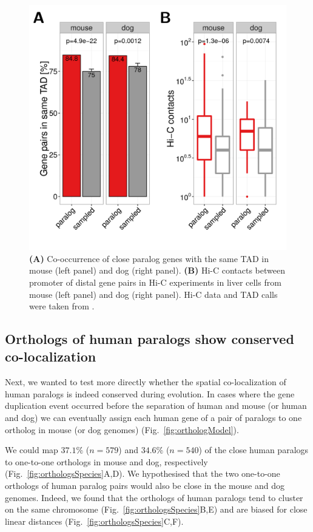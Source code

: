 \documentclass[a4paper,twoside=true,openright,parskip=full,chapterprefix=true,11pt,headings=normal,bibliography=totoc,listof=totoc,titlepage=on,captions=tableabove,draft=false]{scrreprt}
\theoremstyle{definition}
\theoremstyle{definition}
\theoremstyle{definition}
\theoremstyle{remark}
\begin{document}
\begin{figure}

{\centering \includegraphics[width=0.5\linewidth]{figures/paralog/fig5_09} 

}

\caption{\textbf{(A)} Co-occurrence of close paralog genes
with the same TAD in mouse (left panel) and dog (right panel).
\textbf{(B)} Hi-C contacts between promoter of distal gene pairs in Hi-C
experiments in liver cells from mouse (left panel) and dog (right
panel). Hi-C data and TAD calls were taken from \citep{VietriRudan2015}.}\label{fig:paralogsMouseDog}
\end{figure}







\hypertarget{orthologs-of-human-paralogs-show-conserved-co-localization}{%
\subsection{Orthologs of human paralogs show conserved
co-localization}\label{orthologs-of-human-paralogs-show-conserved-co-localization}}

Next, we wanted to test more directly whether the spatial
co-localization of human paralogs is indeed conserved during evolution.
In cases where the gene duplication event occurred before the separation
of human and mouse (or human and dog) we can eventually assign each
human gene of a pair of paralogs to one ortholog in mouse (or dog
genomes) (Fig.~\ref{fig:orthologModel}).

We could map \(37.1\%\) (\(n=579\)) and \(34.6\%\) (\(n=540\)) of the
close human paralogs to one-to-one orthologs in mouse and dog,
respectively (Fig.~\ref{fig:orthologsSpecies}A,D). We hypothesised that
the two one-to-one orthologs of human paralog pairs would also be close
in the mouse and dog genomes. Indeed, we found that the orthologs of
human paralogs tend to cluster on the same chromosome
(Fig.~\ref{fig:orthologsSpecies}B,E) and are biased for close linear
distances (Fig.~\ref{fig:orthologsSpecies}C,F).
\end{document}
